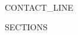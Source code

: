 \documentclass[11pt,a4paper]{article}
\newcommand{\beforeheaderskip}{-15pt}
{{LAYOUT_PARAMS}}
\newcommand{\normalfontsize}{\small}
\begin{document}
\vspace*{\beforeheaderskip}

\begin{center}
    {\normalfontsize\textbf{}} \\[2pt]
    {\footnotesize {{CONTACT_LINE}}}
\end{center}

\vspace{4pt}

{{SECTIONS}}
\end{document}
